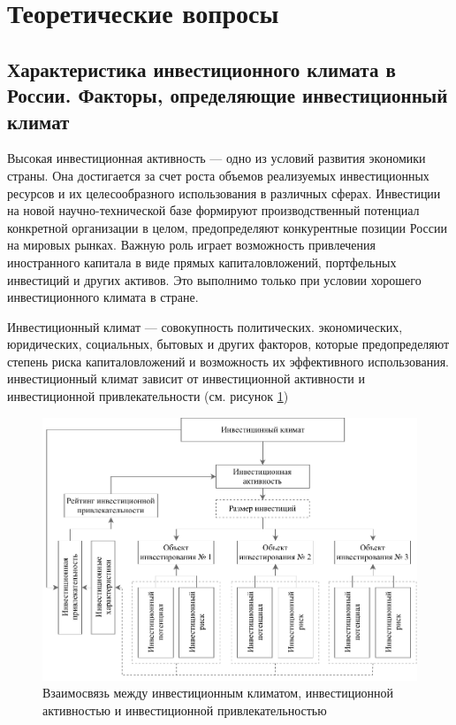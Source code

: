 \section{Теоретические вопросы}
\subsection{Характеристика инвестиционного климата в России. Факторы, определяющие инвестиционный климат}

Высокая инвестиционная активность --- одно из условий развития экономики страны.
Она достигается за счет роста объемов реализуемых инвестиционных ресурсов и их целесообразного использования в различных сферах.
Инвестиции на новой научно-технической базе формируют производственный потенциал конкретной организации в целом, предопределяют конкурентные позиции России на мировых рынках.
Важную роль играет возможность привлечения иностранного капитала в виде прямых капиталовложений, портфельных инвестиций и других активов.
Это выполнимо только при условии хорошего инвестиционного климата в стране.

Инвестиционный климат --- совокупность  политических. экономических, юридических, социальных, бытовых и других факторов, которые предопределяют степень риска капиталовложений и возможность их эффективного использования.
инвестиционный климат зависит от инвестиционной активности и инвестиционной привлекательности (см. рисунок \ref{fig:invest})

\begin{figure}[h]
	\centering
	\includegraphics[width=1\linewidth]{invest}
	\caption{Взаимосвязь между инвестиционным климатом, инвестиционной активностью и инвестиционной привлекательностью}
	\label{fig:invest}
\end{figure}

